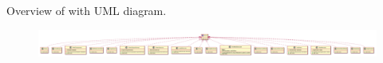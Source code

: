 Overview of \texttt{\pkg} with UML diagram.

\begin{figure}[H]
	\centering
	\includegraphics[width=\textwidth]{packageDiagrams/actionPackage}
\end{figure}
